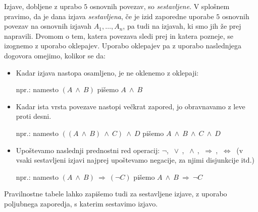 \documentclass[11pt,paper=b5,footinclude,headinclude]{scrbook} %
\newcounter{example}
\def\ali {{~\vee~}}
\def\inn {{~\wedge~}}
\def\sledi {{~\Rightarrow~}}
\def\cee {{~\Leftrightarrow~}}
\begin{document}
\medskip

Izjave, dobljene z uprabo $5$ osnovnih povezav, so \emph{ sestavljene}. V splošnem pravimo, da je dana izjava \emph{ sestavljena}, če je izid
zaporedne uporabe $5$ osnovnih povezav na osnovnih izjavah $A_1,\ldots, A_n$, pa tudi na izjavah, ki smo jih že prej napravili.
Dvomom o tem, katera povezava sledi prej in katera pozneje, se izognemo z uporabo oklepajev.
Uporabo oklepajev pa z uporabo naslednjega dogovora omejimo, kolikor se da:
\begin{itemize}
  \item Kadar izjava nastopa osamljeno, je ne oklenemo z oklepaji:

  npr.: namesto $(A\inn B)$ pišemo $A\inn B$

  \item Kadar ista vrsta povezave nastopi večkrat zapored, jo obravnavamo z leve proti desni.

  npr.: namesto $((A\inn B) \inn C) \inn D$ pišemo $A\inn B \inn C\inn D$

  \item Upoštevamo naslednji prednostni red operacij:
  $\neg$, $\ali$, $\inn$, $\sledi$, $\cee$ (v vsaki sestavljeni izjavi najprej upoštevamo negacije, za njimi disjunkcije itd.)

  npr.: namesto $(A\inn B) \sledi (\neg C)$ pišemo  $A\inn B \sledi\neg C$
\end{itemize}

\medskip
Pravilnostne tabele lahko zapišemo tudi za sestavljene izjave, z uporabo poljubnega
zaporedja, s katerim sestavimo izjavo.

\end{document}
